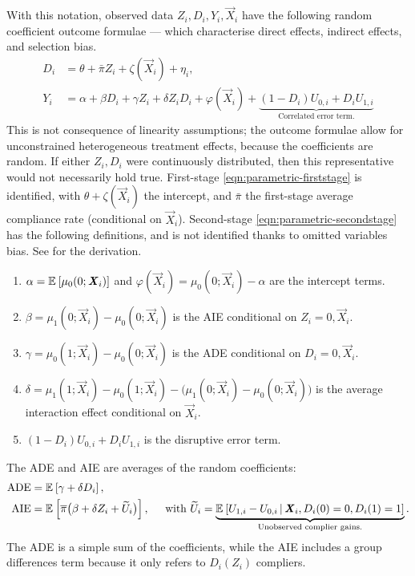 With this notation, observed data $Z_i, D_i, Y_i, \vec X_i$ have the following random coefficient outcome formulae --- which characterise direct effects, indirect effects, and selection bias.
\begin{align}
    \label{eqn:parametric-firststage}
    D_i &= \theta + \bar \pi Z_i + \zeta(\vec X_i) + \eta_i,  \\
    \label{eqn:parametric-secondstage}
    Y_i &= \alpha + \beta D_i + \gamma Z_i + \delta Z_i D_i
    + \varphi(\vec X_i)
    + \underbrace{ \left(1 - D_i \right) U_{0,i} + D_i U_{1,i}}_{
        \text{Correlated error term.}}
\end{align}
This is not consequence  of linearity assumptions; the outcome formulae allow for unconstrained heterogeneous treatment effects, because the coefficients are random.
If either $Z_i, D_i$ were continuously distributed, then this representative would not necessarily hold true.
First-stage \eqref{eqn:parametric-firststage} is identified, with $\theta + \zeta(\vec X_i)$ the intercept, and $\bar \pi$ the first-stage average compliance rate (conditional on $\vec X_i$).
Second-stage \eqref{eqn:parametric-secondstage} has the following definitions, and is not identified thanks to omitted variables bias.
See  for the derivation.
\begin{enumerate}[label=\textbf{(\alph*)}]
    \item $\alpha = \mathbb{E}_{} \left[ \mu_0(0; \boldsymbol{\mathit{X}}_i) \right]$ and $\varphi(\vec X_i) = \mu_0(0; \vec X_i) - \alpha$ are the intercept terms.
    \item $\beta = \mu_1(0; \vec X_i) - \mu_0(0; \vec X_i)$ is the AIE conditional on $Z_i = 0, \vec X_i$.
    \item $\gamma = \mu_0(1; \vec X_i) - \mu_0(0; \vec X_i)$ is the ADE conditional on $D_i = 0, \vec X_i$.
    \item $\delta = \mu_1(1; \vec X_i) - \mu_0(1; \vec X_i) - \big( \mu_1(0; \vec X_i) - \mu_0(0; \vec X_i) \big)$ is the average interaction effect conditional on $\vec X_i$.
    \item $\left( 1 - D_i \right) U_{0,i} + D_i U_{1,i}$ is the disruptive error term.
\end{enumerate}

The ADE and AIE are averages of the random coefficients:
\begin{align*}
    \text{ADE}
        &= \mathbb{E}_{} \left[ \gamma + \delta D_i \right], \\
    \text{AIE}
        &= \mathbb{E}_{} \left[  \overline{\pi} \big( \beta +  \delta Z_i + \widetilde{U}_i \big) \right],
        \;\;\;\; \text{ with } \widetilde{U}_i
            = \underbrace{\mathbb{E}_{} \left[  U_{1,i} - U_{0,i} \, \middle\vert \, 
                \boldsymbol{\mathit{X}}_i, D_i(0) = 0, D_i(1) = 1 \right]}_{
                    \text{Unobserved complier gains.}}.
\end{align*}
The ADE is a simple sum of the coefficients, while the AIE includes a group differences term because it only refers to $D_i(Z_i)$ compliers.

